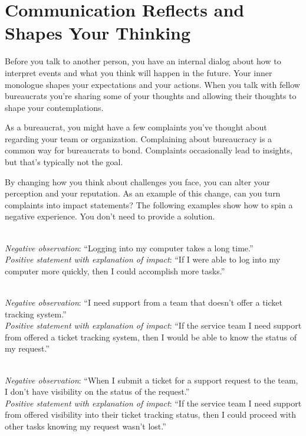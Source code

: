 
\section{Communication Reflects and Shapes Your Thinking}

Before you talk to another person, you have an internal dialog about how to interpret events and what you think will happen in the future. Your inner monologue shapes your expectations and your actions. When you talk with fellow bureaucrats you're sharing some of your thoughts and allowing their thoughts to shape your contemplations. 

As a bureaucrat, you might have a few complaints you've thought about regarding your team or organization. Complaining about bureaucracy is a common way for bureaucrats to bond. Complaints occasionally lead to insights, but that's typically not the goal. 

By changing how you think about challenges you face, you can alter your perception and your reputation. As an example of this change, can you turn complaints into impact statements? 
The following examples show how to spin a negative experience. You don't need to provide a solution. 

\ \\
\textit{Negative observation}: ``Logging into my computer takes a long time.''\\
\textit{Positive statement with explanation of impact}: ``If I were able to log into my computer more quickly, then I could accomplish more tasks.''

\ \\
\textit{Negative observation}: ``I need support from a team that doesn't offer a ticket tracking system.''\\
\textit{Positive statement with explanation of impact}: ``If the service team I need support from offered a ticket tracking system, then I would be able to know the status of my request.''

\ \\
\textit{Negative observation}: ``When I submit a ticket for a support request to the team, I don't have visibility on the status of the request.''\\
\textit{Positive statement with explanation of impact}: ``If the service team I need support from offered visibility into their ticket tracking status, then I could proceed with other tasks knowing my request wasn't lost.''

